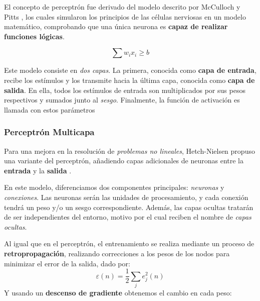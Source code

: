 El concepto de perceptrón fue derivado del modelo descrito por McCulloch y Pitts \cite{McCulloh1943ANets}, los cuales simularon los principios de las células nerviosas en un modelo matemático, comprobando que una única neurona es \textbf{capaz de realizar funciones lógicas}.

\begin{equation}
\sum w_{i}x_{i} \ge b
\end{equation}

Este modelo consiste en \textit{dos capas}. La primera, conocida como \textbf{capa de entrada}, recibe los estímulos y los transmite hacia la última capa, conocida como \textbf{capa de salida}. En ella, todos los estímulos de entrada son multiplicados por sus pesos respectivos y sumados junto al \textit{sesgo}. Finalmente, la función de activación es llamada con estos parámetros 


\subsubsection{Perceptrón Multicapa}

Para una mejora en la resolución de \textit{problemas no lineales}, Hetch-Nielsen propuso una variante del perceptrón, añadiendo capas adicionales de neuronas entre la \textbf{entrada} y la \textbf{salida} \cite{Hecht-Nielsen1989Neurocomputing}.


En este modelo, diferenciamos dos componentes principales: \textit{neuronas} y \textit{conexiones}. Las neuronas serán las unidades de procesamiento, y cada conexión tendrá un peso y/o un sesgo correspondiente. Además, las capas ocultas tratarán de ser independientes del entorno, motivo por el cual reciben el nombre de \textit{capas ocultas}.

Al igual que en el perceptrón, el entrenamiento se realiza mediante un proceso de \textbf{retropropagación}, realizando correcciones a los pesos de los nodos para minimizar el error de la salida, dado por\cite{Haykin1998NeuralFoundation}:
\begin{equation}
    \varepsilon (n) = \frac{1}{2}\sum_{j}e_{j}^2(n)
\end{equation}
Y usando un \textbf{descenso de gradiente} obtenemos el cambio en cada peso\cite{Haykin1998NeuralFoundation}:

